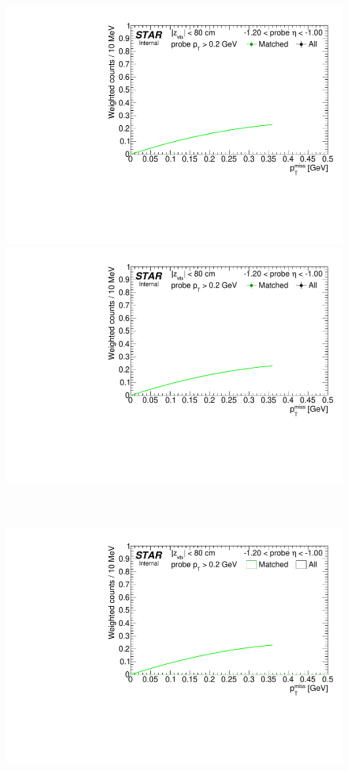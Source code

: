 \begin{figure}[ht]\ContinuedFloat
\centering
\parbox{0.495\textwidth}{
  \centering
  
  \includegraphics[width=\linewidth,page=10]{graphics/correctionsToEff/TOF_tagAndProbe/Fitting_effVsEta_data.CPT.pdf}\\
  \includegraphics[width=\linewidth,page=11]{graphics/correctionsToEff/TOF_tagAndProbe/Fitting_effVsEta_data.CPT.pdf}
}~
\parbox{0.495\textwidth}{
  \centering
  \includegraphics[width=\linewidth,page=10]{graphics/correctionsToEff/TOF_tagAndProbe/Fitting_effVsEta_mc.CPT.pdf}\\
}
\end{figure}
